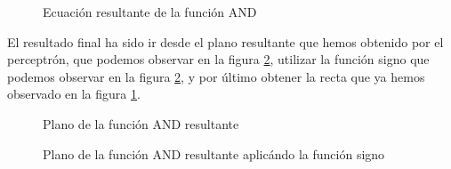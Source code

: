 \begin{figure}[H]
\centering
\caption{Ecuación resultante de la función AND}
\label{plot:perceptronANDFunction2dim}
\end{figure}

\newpage
El resultado final ha sido ir desde el plano resultante que hemos obtenido por el perceptrón, que podemos observar en la figura \ref{plot:perceptronANDFunction3dim}, utilizar la función signo que podemos observar en la figura \ref{plot:perceptronANDFunction3dim}, y por último obtener la recta que ya hemos observado en la figura \ref{plot:perceptronANDFunction2dim}.

\begin{figure}[H]
\centering


\caption{Plano de la función AND resultante}
\label{plot:perceptronANDFunction3dim}
\end{figure}

\begin{figure}[H]
\centering


\caption{Plano de la función AND resultante aplicándo la función signo}
\label{plot:perceptronANDFunction3dimsign}
\end{figure}

